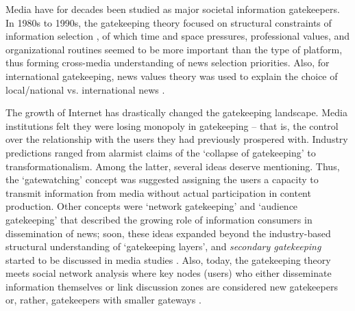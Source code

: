 Media have for decades been studied as major societal information gatekeepers. In 1980s to 1990s, the gatekeeping theory focused on structural constraints of information selection \cite{DonahueOlienTichenor}, of which time and space pressures, professional values, and organizational routines seemed to be more important than the type of platform, thus forming cross-media understanding of news selection priorities. Also, for international gatekeeping, news values theory was used to explain the choice of local/national vs. international news \cite{RobertsBantimaroudis}.

The growth of Internet has drastically changed the gatekeeping landscape. Media institutions felt they were losing monopoly in gatekeeping -- that is, the control over the relationship with the users they had previously prospered with. Industry predictions ranged from alarmist claims of the ‘collapse of gatekeeping’ \cite{WilliamsDeliCarpini} to transformationalism. Among the latter, several ideas deserve mentioning. Thus, the ‘gatewatching’ concept was suggested \cite{Bruns} assigning the users a capacity to transmit information from media without actual participation in content production. Other concepts were ‘network gatekeeping’ \cite{BarzilaiNahon} and ‘audience gatekeeping’ \cite{ShoemakerVos} that described the growing role of information consumers in dissemination of news; soon, these ideas expanded beyond the industry-based structural understanding of ‘gatekeeping layers’, and \textit{secondary gatekeeping} started to be discussed in media studies \cite[p.~6]{ShoemakerVos} \cite{RobertsBantimaroudis,White1950}. Also, today, the gatekeeping theory meets social network analysis where key nodes (users) who either disseminate information themselves or link discussion zones are considered new gatekeepers \cite{JurgensJungherrSchoen} or, rather, gatekeepers with smaller gateways \cite{BastosRaimundoTravitzki}.

